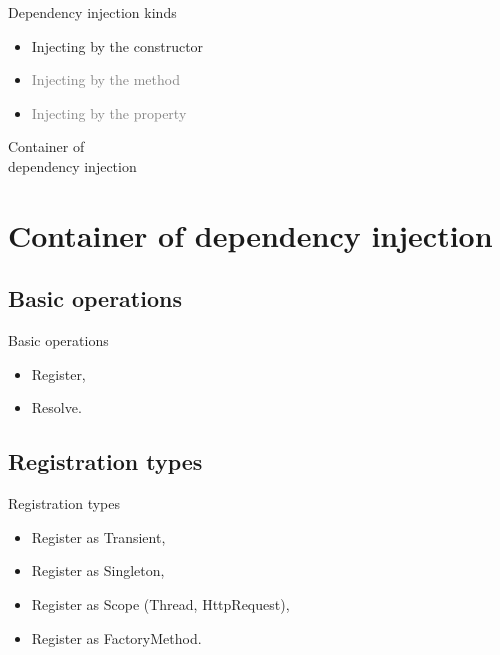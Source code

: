 \documentclass{beamer}
\begin{document}
\begin{frame}{Dependency injection kinds}
     \begin{Large}
	\begin{itemize}
		\item Injecting by the constructor
		\item \textcolor{gray}{Injecting by the method}
		\item \textcolor{gray}{Injecting by the property}
	\end{itemize}
     \end{Large}
\end{frame}

\begin{frame}{}
	\begin{center}
		\Huge{Container of\\ dependency injection}
	\end{center}
\end{frame}

\section{Container of dependency injection}

\subsection*{Basic operations}

\begin{frame}{Basic operations}
     \begin{Large}
	\begin{itemize}
		\item Register,
		\item Resolve.
	\end{itemize}
     \end{Large}
\end{frame}

\subsection*{Registration types}

\begin{frame}{Registration types}
     \begin{Large}
	\begin{itemize}
		\item Register as Transient,
		\item Register as Singleton,
		\item Register as Scope (Thread, HttpRequest),
		\item Register as FactoryMethod.
	\end{itemize}
     \end{Large}
\end{frame}
\end{document}
